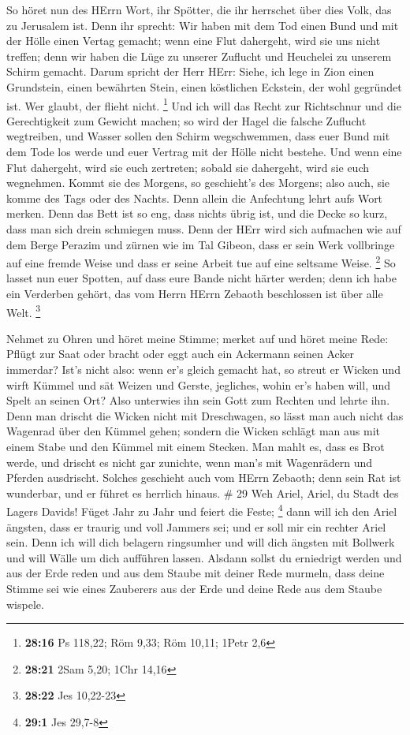  So höret nun des HErrn Wort, ihr Spötter, die ihr
herrschet über dies Volk, das zu Jerusalem ist.  Denn ihr
sprecht: Wir haben mit dem Tod einen Bund und mit der Hölle einen Vertag
gemacht; wenn eine Flut dahergeht, wird sie uns nicht treffen; denn wir
haben die Lüge zu unserer Zuflucht und Heuchelei zu unserem Schirm
gemacht.  Darum spricht der Herr HErr: Siehe, ich lege in
Zion einen Grundstein, einen bewährten Stein, einen köstlichen Eckstein,
der wohl gegründet ist. Wer glaubt, der flieht nicht. \footnote{\textbf{28:16}
  Ps 118,22; Röm 9,33; Röm 10,11; 1Petr 2,6}  Und ich will
das Recht zur Richtschnur und die Gerechtigkeit zum Gewicht machen; so
wird der Hagel die falsche Zuflucht wegtreiben, und Wasser sollen den
Schirm wegschwemmen,  dass euer Bund mit dem Tode los werde
und euer Vertrag mit der Hölle nicht bestehe. Und wenn eine Flut
dahergeht, wird sie euch zertreten; sobald sie dahergeht, wird sie euch
wegnehmen.  Kommt sie des Morgens, so geschieht's des
Morgens; also auch, sie komme des Tags oder des Nachts. Denn allein die
Anfechtung lehrt aufs Wort merken.  Denn das Bett ist so
eng, dass nichts übrig ist, und die Decke so kurz, dass man sich drein
schmiegen muss.  Denn der HErr wird sich aufmachen wie auf
dem Berge Perazim und zürnen wie im Tal Gibeon, dass er sein Werk
vollbringe auf eine fremde Weise und dass er seine Arbeit tue auf eine
seltsame Weise. \footnote{\textbf{28:21} 2Sam 5,20; 1Chr 14,16}
 So lasset nun euer Spotten, auf dass eure Bande nicht
härter werden; denn ich habe ein Verderben gehört, das vom Herrn HErrn
Zebaoth beschlossen ist über alle Welt. \footnote{\textbf{28:22} Jes
  10,22-23}

 Nehmet zu Ohren und höret meine Stimme; merket auf und
höret meine Rede:  Pflügt zur Saat oder bracht oder eggt
auch ein Ackermann seinen Acker immerdar?  Ist's nicht
also: wenn er's gleich gemacht hat, so streut er Wicken und wirft Kümmel
und sät Weizen und Gerste, jegliches, wohin er's haben will, und Spelt
an seinen Ort?  Also unterwies ihn sein Gott zum Rechten
und lehrte ihn.  Denn man drischt die Wicken nicht mit
Dreschwagen, so lässt man auch nicht das Wagenrad über den Kümmel gehen;
sondern die Wicken schlägt man aus mit einem Stabe und den Kümmel mit
einem Stecken.  Man mahlt es, dass es Brot werde, und
drischt es nicht gar zunichte, wenn man's mit Wagenrädern und Pferden
ausdrischt.  Solches geschieht auch vom HErrn Zebaoth; denn
sein Rat ist wunderbar, und er führet es herrlich hinaus. \# 29
 Weh Ariel, Ariel, du Stadt des Lagers Davids! Füget Jahr zu
Jahr und feiert die Feste; \footnote{\textbf{29:1} Jes 29,7-8}
 dann will ich den Ariel ängsten, dass er traurig und voll
Jammers sei; und er soll mir ein rechter Ariel sein.  Denn
ich will dich belagern ringsumher und will dich ängsten mit Bollwerk und
will Wälle um dich aufführen lassen.  Alsdann sollst du
erniedrigt werden und aus der Erde reden und aus dem Staube mit deiner
Rede murmeln, dass deine Stimme sei wie eines Zauberers aus der Erde und
deine Rede aus dem Staube wispele.

